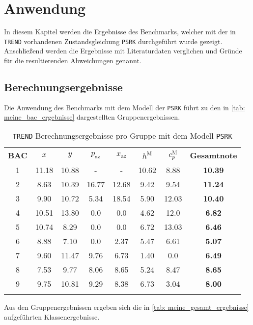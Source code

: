 \documentclass[../thesis.tex]{subfiles}
\begin{document}
\chapter{Anwendung}

In diesem Kapitel werden die Ergebnisse des Benchmarks, welcher mit der in \texttt{TREND} vorhandenen Zustandsgleichung \texttt{PSRK} durchgeführt wurde gezeigt. Anschließend werden die Ergebnisse mit Literaturdaten verglichen und Gründe für die resultierenden Abweichungen genannt.

\section{Berechnungsergebnisse}

Die Anwendung des Benchmarks mit dem Modell der \texttt{PSRK} führt zu den in \autoref{tab: meine_bac_ergebnisse} dargestellten Gruppenergebnissen.

\begin{table} [htb]
	\centering
	\caption{\texttt{TREND} Berechnungsergebnisse pro Gruppe mit dem Modell \texttt{PSRK}}
	\begin{tabular}{ cccccccc }
		\hline
		BAC & $ x $ & $ y $ & $ p_\mathrm{az}$ & $ x_\mathrm{az}$ & $ h^\mathrm{M} $ & $ c_p^\mathrm{M} $ & \textbf{Gesamtnote} \\
		\hline
		1 & 11.18 & 10.88 & -     & -     & 10.62 & 8.88  & \textbf{10.39}\\
		2 & 8.63  & 10.39 & 16.77 & 12.68 & 9.42  & 9.54  & \textbf{11.24}\\
		3 & 9.90  & 10.72 & 5.34  & 18.54 & 5.90  & 12.03 & \textbf{10.40}\\
		4 & 10.51 & 13.80 & 0.0   & 0.0   & 4.62  & 12.0  & \textbf{6.82}\\
		5 & 10.74 & 8.29  & 0.0   & 0.0   & 6.72  & 13.03 & \textbf{6.46}\\
		6 & 8.88  & 7.10  & 0.0   & 2.37  & 5.47  & 6.61  & \textbf{5.07}\\
		7 & 9.60  & 11.47 & 9.76  & 6.73  & 1.40  & 0.0   & \textbf{6.49}\\
		8 & 7.53  & 9.77  & 8.06  & 8.65  & 5.24  & 8.47  & \textbf{8.65}\\
		9 & 9.75  & 10.81 & 9.29  & 8.38  & 6.73  & 3.04  & \textbf{8.00}\\
		\hline
		\label{tab: meine_bac_ergebnisse}
	\end{tabular}
\end{table}


Aus den Gruppenergebnissen ergeben sich die in \autoref{tab: meine_gesamt_ergebnisse} aufgeführten Klassenergebnisse.
\end{document}
